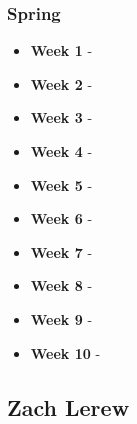 \documentclass[onecolumn, draftclsnofoot,10pt, compsoc]{IEEEtran}
\begin{document}
			\subsubsection{Spring}
				\begin{itemize}
					\item \textbf{Week 1} -
					\item \textbf{Week 2} -
					\item \textbf{Week 3} -
					\item \textbf{Week 4} -
					\item \textbf{Week 5} -
					\item \textbf{Week 6} -
					\item \textbf{Week 7} -
					\item \textbf{Week 8} -
					\item \textbf{Week 9} -
					\item \textbf{Week 10} -
				\end{itemize}
		\subsection{Zach Lerew}
\end{document}
